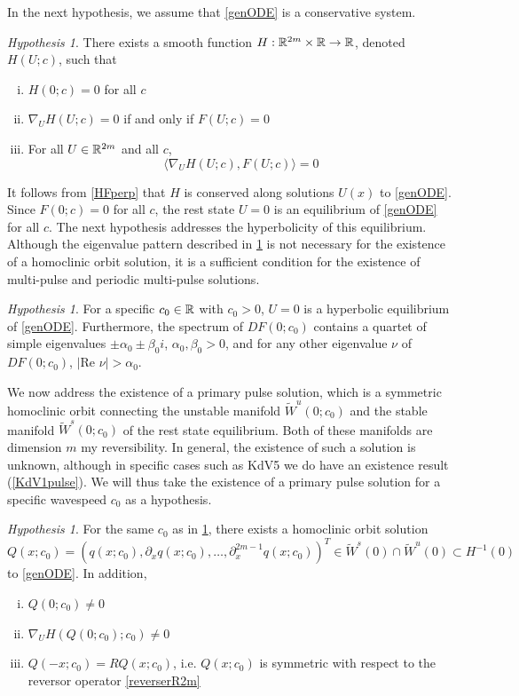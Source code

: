 \documentclass[11pt,reqno]{amsart}
\theoremstyle{plain}
\theoremstyle{definition}
\theoremstyle{remark}
\newtheorem{hypothesis}[theorem]{Hypothesis}
\begin{document}
In the next hypothesis, we assume that \cref{genODE} is a conservative system.
\begin{hypothesis}\label{Hhyp}
There exists a smooth function $H: \mathbb{R}^{2m} \times \mathbb{R} \rightarrow \mathbb{R}$, denoted $H(U; c)$, such that 
\begin{enumerate}[(i)]
\item $H(0; c) = 0$ for all $c$
\item $\nabla_U H(U; c) = 0$ if and only if $F(U; c) = 0$
\item For all $U \in \mathbb{R}^{2m}$ and all $c$,
\begin{equation}\label{HFperp}
\langle \nabla_U H(U; c), F(U; c) \rangle = 0
\end{equation}
\end{enumerate}
\end{hypothesis}

\noi It follows from \cref{HFperp} that $H$ is conserved along solutions $U(x)$ to \cref{genODE}. Since $F(0; c) = 0$ for all $c$, the rest state $U = 0$ is an equilibrium of \cref{genODE} for all $c$. The next hypothesis addresses the hyperbolicity of this equilibrium. Although the eigenvalue pattern described in \cref{hypeqhyp} is not necessary for the existence of a homoclinic orbit solution, it is a sufficient condition for the existence of multi-pulse and periodic multi-pulse solutions.

\begin{hypothesis}\label{hypeqhyp}
For a specific $c_0 \in \mathbb{R}$ with $c_0 > 0$, $U = 0$ is a hyperbolic equilibrium of \cref{genODE}. Furthermore, the spectrum of $DF(0; c_0)$ contains a quartet of simple eigenvalues $\pm \alpha_0 \pm \beta_0 i$, $\alpha_0, \beta_0 > 0$, and for any other eigenvalue $\nu$ of $DF(0; c_0)$, $|\text{Re }\nu| > \alpha_0$.
\end{hypothesis}

We now address the existence of a primary pulse solution, which is a symmetric homoclinic orbit connecting the unstable manifold $\tilde{W}^u(0; c_0)$ and the stable manifold $\tilde{W}^s(0; c_0)$ of the rest state equilibrium. Both of these manifolds are dimension $m$ my reversibility. In general, the existence of such a solution is unknown, although in specific cases such as KdV5 we do have an existence result (\cref{KdV1pulse}). We will thus take the existence of a primary pulse solution for a specific wavespeed $c_0$ as a hypothesis.

\begin{hypothesis}\label{Qexistshyp}
For the same $c_0$ as in \cref{hypeqhyp}, there exists a homoclinic orbit solution $Q(x; c_0) = (q(x; c_0), \partial_x q(x; c_0), \dots, \partial_x^{2m-1}q(x; c_0))^T\in \tilde{W}^s(0) \cap \tilde{W}^u(0) \subset H^{-1}(0)$ to \cref{genODE}. In addition,
\begin{enumerate}[(i)]
\item $Q(0; c_0) \neq 0$
\item $\nabla_U H(Q(0; c_0); c_0) \neq 0$
\item $Q(-x; c_0) = R Q(x; c_0)$, i.e. $Q(x; c_0)$ is symmetric with respect to the reversor operator \cref{reverserR2m}
\end{enumerate}
\end{hypothesis}
\end{document}
